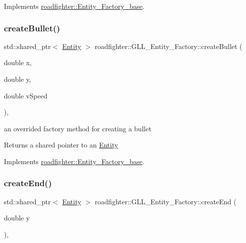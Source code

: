 Implements \hyperlink{classroadfighter_1_1Entity__Factory__base_a888f537d2deed2d90a391c1900e9fdb6}{roadfighter\+::\+Entity\+\_\+\+Factory\+\_\+base}.

\mbox{\label{classroadfighter_1_1GLL__Entity__Factory_a7fcd57b8a2ae18240476f6dc64216822}} 
\subsubsection{\texorpdfstring{create\+Bullet()}{createBullet()}}
{\footnotesize\ttfamily std\+::shared\+\_\+ptr$<$ \hyperlink{classroadfighter_1_1Entity}{Entity} $>$ roadfighter\+::\+G\+L\+L\+\_\+\+Entity\+\_\+\+Factory\+::create\+Bullet (\begin{DoxyParamCaption}\item[{double}]{x,  }\item[{double}]{y,  }\item[{double}]{v\+Speed }\end{DoxyParamCaption})\hspace{0.3cm}{\ttfamily [override]}, {\ttfamily [virtual]}}

an overrided factory method for creating a bullet \begin{DoxyReturn}{Returns}
a shared pointer to an \hyperlink{classroadfighter_1_1Entity}{Entity} 
\end{DoxyReturn}


Implements \hyperlink{classroadfighter_1_1Entity__Factory__base_a5241bdb886a9f1b086d009a0f6478045}{roadfighter\+::\+Entity\+\_\+\+Factory\+\_\+base}.

\mbox{\label{classroadfighter_1_1GLL__Entity__Factory_ae26222829d8295cef0aa708a7ee909b7}} 
\subsubsection{\texorpdfstring{create\+End()}{createEnd()}}
{\footnotesize\ttfamily std\+::shared\+\_\+ptr$<$ \hyperlink{classroadfighter_1_1Entity}{Entity} $>$ roadfighter\+::\+G\+L\+L\+\_\+\+Entity\+\_\+\+Factory\+::create\+End (\begin{DoxyParamCaption}\item[{double}]{y }\end{DoxyParamCaption})\hspace{0.3cm}{\ttfamily [override]}, {\ttfamily [virtual]}}

